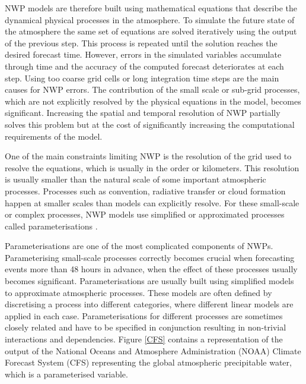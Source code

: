 NWP models are therefore built using mathematical equations that describe the dynamical physical processes in the atmosphere. To simulate the future state of the atmosphere the same set of equations are solved iteratively using the output of the previous step. This process is repeated until the solution reaches the desired forecast time. However, errors in the simulated variables accumulate through time and the accuracy of the computed forecast deteriorates at each step. Using too coarse grid cells or long integration time steps are the main causes for NWP errors. The contribution of the small scale or sub-grid processes, which are not explicitly resolved by the physical equations in the model, becomes significant. Increasing the spatial and temporal resolution of NWP partially solves this problem but at the cost of significantly increasing the computational requirements of the model.

\medskip

One of the main constraints limiting NWP is the resolution of the grid used to resolve the equations, which is usually in the order or kilometers. This resolution is usually smaller than the natural scale of some important atmospheric processes. Processes such as convention, radiative transfer or cloud formation happen at smaller scales than models can explicitly resolve. For these small-scale or complex processes, NWP models use simplified or approximated processes called parameterisations \citep{milton1996impact,delage1997parameterising}. 

\medskip

Parameterisations are one of the most complicated components of NWPs. Parameterising small-scale processes correctly becomes crucial when forecasting events more than 48 hours in advance, when the effect of these processes usually becomes significant. Parameterisations are usually built using simplified models to approximate atmospheric processes. These models are often defined by discretising a process into different categories, where different linear models are applied in each case. Parameterisations for different processes are sometimes closely related and have to be specified in conjunction resulting in non-trivial interactions and dependencies. Figure \ref{CFS} contains a representation of the output of the National Oceans and Atmosphere Administration (NOAA) Climate Forecast System (CFS) representing  the global atmospheric precipitable water, which is a parameterised variable. 

\medskip

